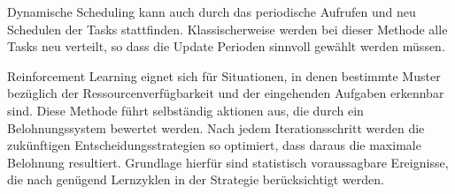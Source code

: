 Dynamische Scheduling kann auch durch das periodische Aufrufen und neu Schedulen der Tasks stattfinden. Klassischerweise werden bei dieser Methode alle Tasks neu verteilt, so dass die Update Perioden sinnvoll gewählt werden müssen. 

Reinforcement Learning eignet sich für Situationen, in denen bestimmte Muster bezüglich der Ressourcenverfügbarkeit und der eingehenden Aufgaben erkennbar sind. Diese Methode führt selbständig aktionen aus, die durch ein Belohnungssystem bewertet werden. Nach jedem Iterationsschritt werden die zukünftigen Entscheidungsstrategien so optimiert, dass daraus die maximale Belohnung resultiert. Grundlage hierfür sind statistisch voraussagbare Ereignisse, die nach genügend Lernzyklen in der Strategie berücksichtigt werden.